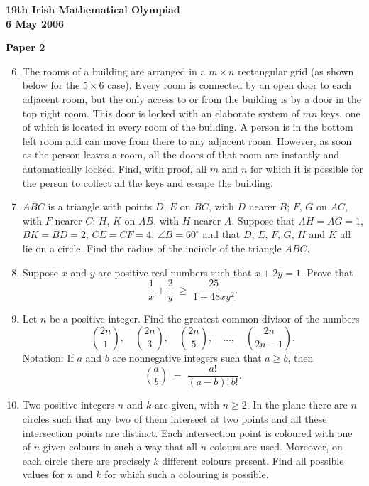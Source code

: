 \documentclass[12pt]{article}
\begin{document}
\newpage
\begin{center}
{\large\bfseries 19th Irish Mathematical Olympiad\\6 May 2006}
\end{center}
\bigskip\noindent\textbf{Paper 2}\bigskip
\begin{enumerate}
\setcounter{enumi}{5}
\item The rooms of a building are arranged in a $m \times n$ rectangular grid (as shown below for the $5 \times 6$ case). Every room is connected by an open door to each adjacent room, but the only access to or from the building is by a door in the top right room. This door is locked with an elaborate system of $mn$ keys, one of which is located in every room of the building. A person is in the bottom left room and can move from there to any adjacent room. However, as soon as the person leaves a room, all the doors of that room are instantly and automatically locked. Find, with proof, all $m$ and $n$ for which it is possible for the person to collect all the keys and escape the building.

\item $ABC$ is a triangle with points $D$, $E$ on $BC$, with $D$ nearer $B$; $F$, $G$ on $AC$, with $F$ nearer $C$; $H$, $K$ on $AB$, with $H$ nearer $A$. Suppose that $AH = AG = 1$, $BK = BD = 2$, $CE = CF = 4$, $\angle B = 60^\circ$ and that $D$, $E$, $F$, $G$, $H$ and $K$ all lie on a circle. Find the radius of the incircle of the triangle $ABC$.

\item Suppose $x$ and $y$ are positive real numbers such that $x + 2y = 1$. Prove that
\[
\frac{1}{x} + \frac{2}{y} \;\ge\; \frac{25}{1 + 48xy^2}.
\]

\item Let $n$ be a positive integer. Find the greatest common divisor of the numbers
\[
\binom{2n}{1},\quad \binom{2n}{3},\quad \binom{2n}{5},\quad \ldots,\quad \binom{2n}{2n-1}.
\]
Notation: If $a$ and $b$ are nonnegative integers such that $a \ge b$, then
\[
\binom{a}{b} \;=\; \frac{a!}{(a-b)!\,b!}.
\]

\item Two positive integers $n$ and $k$ are given, with $n \ge 2$. In the plane there are $n$ circles such that any two of them intersect at two points and all these intersection points are distinct. Each intersection point is coloured with one of $n$ given colours in such a way that all $n$ colours are used. Moreover, on each circle there are precisely $k$ different colours present. Find all possible values for $n$ and $k$ for which such a colouring is possible.
\end{enumerate}
\end{document}
